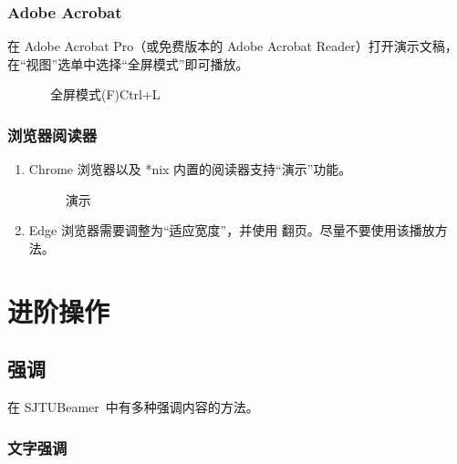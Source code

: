 \documentclass[
    UTF8,
    heading=true,
    12pt,
    a4paper
]{ctexrep}
\def\themename{\textsf{SJTUBeamer}}
\begin{document}
\section{Adobe Acrobat}

在 Adobe Acrobat Pro（或免费版本的 Adobe Acrobat Reader）打开演示文稿，在“视图”选单中选择“全屏模式”即可播放。

\begin{figure}[h]
  \centering
  \begin{tcolorbox}[enhanced, title={视图(V)}, attach boxed title to top left, boxed title style={sharp corners}, sharp corners, tile, width=6cm]
    \faTv\ 全屏模式(F)\hfill Ctrl+L
  \end{tcolorbox}
\end{figure}

\section{浏览器阅读器}

\begin{enumerate}
  \item[\faChrome] Chrome 浏览器以及 *nix 内置的阅读器支持“演示”功能。
    \begin{figure}[h]
      \centering
      \begin{tcolorbox}[enhanced, title={$\vdots$}, attach boxed title to top right, boxed title style={circular arc,top=0mm,bottom=2mm,left=3.25mm,right=3.25mm}, sharp corners, tile, width=6cm]
        演示
      \end{tcolorbox}
    \end{figure}
  \item[\faInternetExplorer] Edge 浏览器需要调整为“适应宽度”\fbox{\faArrowsAltH}，并使用  翻页。尽量不要使用该播放方法。
\end{enumerate}

\part{进阶操作}

\chapter{强调}

在 \themename\ 中有多种强调内容的方法。

\section{文字强调}
\end{document}
